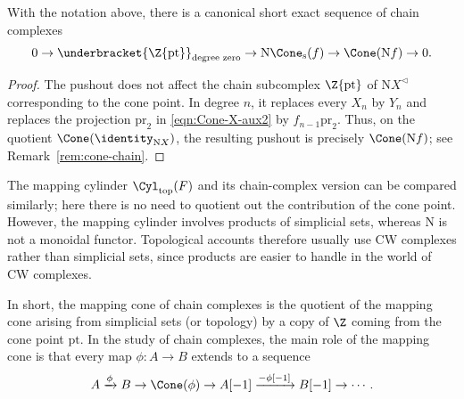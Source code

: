 \begin{proposition}\label{prop:Cone-comparison}
	With the notation above, there is a canonical short exact sequence of
	chain complexes
	\[ 0 \to \underbracket{\Z\{\mathrm{pt}\}}_{\text{degree zero}} \to \mathrm{N}\Cone_{\mathrm{s}}(f) \to \Cone(\mathrm{N}f) \to 0. \]
\end{proposition}
\begin{proof}
	The pushout does not affect the chain subcomplex $\Z\{\mathrm{pt}\}$ of
	$\mathrm{N}X^{\lhd}$ corresponding to the cone point. In degree $n$, it
	replaces every $X_n$ by $Y_n$ and replaces the projection
	$\mathrm{pr}_2$ in \eqref{eqn:Cone-X-aux2} by
	$f_{n-1}\mathrm{pr}_2$. Thus, on the quotient
	$\Cone(\identity_{\mathrm{N}X})$, the resulting pushout is precisely
	$\Cone(\mathrm{N}f)$; see Remark~\ref{rem:cone-chain}.
\end{proof}

\begin{remark}
	The mapping cylinder $\Cyl_{\mathrm{top}}(F)$ and its chain-complex
	version can be compared similarly; here there is no need to quotient out
	the contribution of the cone point. However, the mapping cylinder involves
	products of simplicial sets, whereas $\mathrm{N}$ is not a monoidal
	functor. Topological accounts therefore usually use CW complexes rather
	than simplicial sets, since products are easier to handle in the world of
	CW complexes.
\end{remark}

In short, the mapping cone of chain complexes is the quotient of the mapping
cone arising from simplicial sets (or topology) by a copy of $\Z$ coming
from the cone point $\mathrm{pt}$. In the study of chain complexes, the main
role of the mapping cone is that every map $\phi:A\to B$ extends to a
sequence
\begin{equation}\label{eqn:cofiber-comparison-A}
	A \xrightarrow{\phi} B \to \Cone(\phi) \to A[-1] \xrightarrow{-\phi[-1]} B[-1] \to \cdots .
\end{equation}

